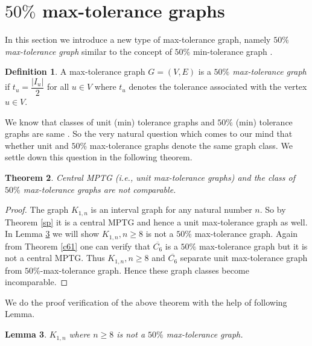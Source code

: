 \documentclass{article}
\newtheorem{thm}{Theorem}[section]
\newtheorem{lem}[thm]{Lemma}
\theoremstyle{definition}
\newtheorem{defn}[thm]{Definition}
\numberwithin{equation}{section}
\begin{document}
\section{$50\%$ max-tolerance graphs}

\noindent In this section we introduce a new type of max-tolerance graph, namely {\em $50\%$ max-tolerance graph} similar to the concept of $50\%$ min-tolerance graph \cite{Bogart}.

\begin{defn}\label{c5}
A max-tolerance graph $G=(V,E)$ is a {\em $50\%$ max-tolerance graph} if $t_{u}=\dfrac{|I_{u}|}{2}$ for all $u\in V$ where $t_{u}$ denotes the tolerance associated with the vertex $u\in V$.
\end{defn}

\noindent  We know that classes of unit (min) tolerance graphs and $50\%$ (min) tolerance graphs are same \cite{Bogart}. So the very natural question which comes to our mind that whether unit and $50\%$ max-tolerance graphs denote the same graph class. We settle down this question in the following theorem.  



\begin{thm}\label{com}
Central MPTG (i.e., unit max-tolerance graphs) and the class of $50\%$ max-tolerance graphs are not comparable.
\end{thm}

\begin{proof}
The graph $K_{1,n}$ is an interval graph for any natural number $n$. So by Theorem \ref{sp} it is a central MPTG and hence a unit max-tolerance graph as well. In Lemma \ref{px4} we will show $K_{1,n}, n\geq 8$ is not a $50\%$ max-tolerance graph. Again from Theorem \ref{c61} one can verify that $\overline{C_{6}}$ is a $50\%$ max-tolerance graph but it is not a central MPTG. Thus $K_{1,n},n\geq 8$ and $\overline{C_{6}}$ separate unit max-tolerance graph from $50\%$-max-tolerance graph. Hence these graph classes become incomparable.    
\end{proof}

\noindent We do the proof verification of the above theorem with the help of following Lemma.

\begin{lem} \label{px4}
\noindent $K_{1,n}$ where $n\geq 8$ is not a $50\%$ max-tolerance graph.
\end{lem}
\end{document}
